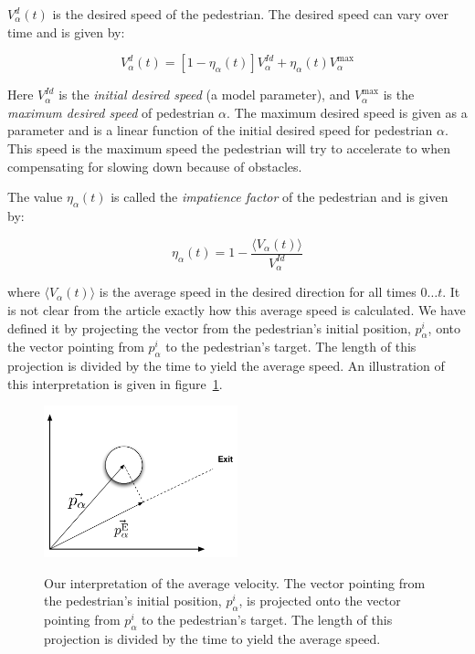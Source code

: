 $V_{\alpha}^{d}(t)$ is the desired speed of the pedestrian. The desired speed 
can vary over time and is given by:

\begin{equation}\label{desired-speed}
    V_{\alpha}^{d}(t) = \left[ 1 - \eta_{\alpha}(t) \right] 
    V_{\alpha}^{Id} +
    \eta_{\alpha}(t) V_{\alpha}^{\text{max}}
\end{equation}

Here $V_{\alpha}^{Id}$ is the \emph{initial desired speed} (a model parameter), 
and $V_{\alpha}^{\text{max}}$ is the \emph{maximum desired speed} of 
pedestrian $\alpha$. The maximum desired speed is given as a parameter and is 
a linear function of the initial desired speed for pedestrian $\alpha$. This 
speed is the maximum speed the pedestrian will try to accelerate to when 
compensating for slowing down because of obstacles.

The value $\eta_{\alpha}(t)$ is called the \emph{impatience factor} of the 
pedestrian and is given by:

\begin{equation}\label{eqn:impatience}
	\eta_{\alpha}(t) =
    1 - \frac{\langle V_{\alpha}(t)\rangle}{V^{Id}_{\alpha}}
\end{equation}

where $\langle V_{\alpha}(t) \rangle$ is the average speed in the desired 
direction for all times $0\dots t$. It is not clear from the article exactly 
how this average speed is calculated. We have defined it by projecting the 
vector from the pedestrian's initial position, $p^i_\alpha$, onto the vector 
pointing from $p^i_\alpha$ to the pedestrian's target. The length of this 
projection is divided by the time to yield the average speed. An 
illustration of this interpretation is given in figure~\ref{impatience}.

\begin{figure}[ht]
    \centering
    {\includegraphics[width=0.5\textwidth]{Figures/NotationOfPedestrian2.pdf}} 
    \caption[Our interpretation of the average velocity]{Our interpretation of 
    the average velocity. The vector pointing from the pedestrian's initial 
    position, $p^i_\alpha$, is projected onto the vector pointing from 
    $p^i_\alpha$ to the pedestrian's target. The length of this projection is 
    divided by the time to yield the average speed.}
    \label{impatience}
\end{figure}

